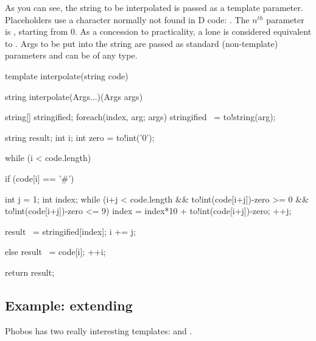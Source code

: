 As you can see, the string to be interpolated is passed as a template parameter. Placeholders use a character normally not found in D code: \DD{\#}. The $n^{th}$ parameter is , starting from 0. As a concession to practicality, a lone \DD{\#} is considered equivalent to . Args to be put into the string are passed as standard (non-template) parameters and can be of any type.

\begin{dcode}
template interpolate(string code)
{
    string interpolate(Args...)(Args args) {
        string[] stringified;
        foreach(index, arg; args) stringified ~= to!string(arg);

        string result;
        int i;
        int zero = to!int('0');

        while (i < code.length) {
            if (code[i] == '#') {
                int j = 1;
                int index;
                while (i+j < code.length
                    && to!int(code[i+j])-zero >= 0
                    && to!int(code[i+j])-zero <= 9)
                {
                    index = index*10 + to!int(code[i+j])-zero;
                    ++j;
                }

                result ~= stringified[index];
                i += j;
            }
            else {
                result ~= code[i];
                ++i;
            }
        }

        return result;
    }
}
\end{dcode}


\subsection{Example: extending }\label{naryfun}


Phobos has two really interesting templates:  and .



